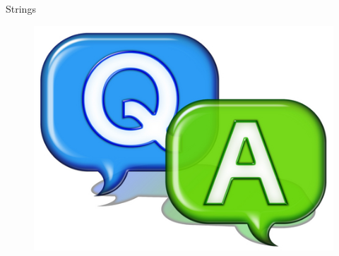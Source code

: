 \documentclass[14pt]{beamer}
\begin{document}
\begin{frame}{Strings}
\begin{figure}[H]
 \begin{center}
   \includegraphics[scale=.3]{qa.png}   
 \end{center}
  \end{figure}
\end{frame}
\end{document}
